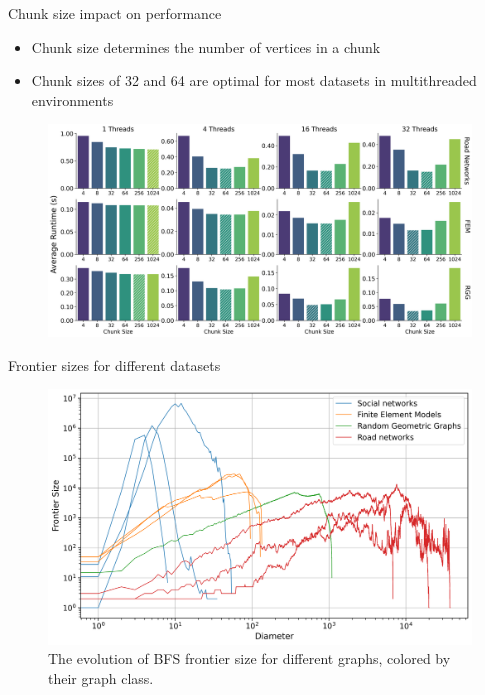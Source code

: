 \appendix
\begin{specialframe}{Chunk size impact on performance}
\begin{itemize}
  \item Chunk size determines the number of vertices in a chunk
  \item Chunk sizes of 32 and 64 are optimal for most datasets in multithreaded environments
\end{itemize}
\begin{figure}
  \centering
  \includegraphics[width=0.8\linewidth]{images/pthreads_chunksize.png}
\end{figure}
\end{specialframe}

\begin{specialframe}{Frontier sizes for different datasets}
\begin{figure}
  \centering
  \includegraphics[width=0.8\linewidth]{images/frontiers_plot.png}
  \caption{The evolution of BFS frontier size for different graphs, colored by their graph class.}
\end{figure}
\end{specialframe}

